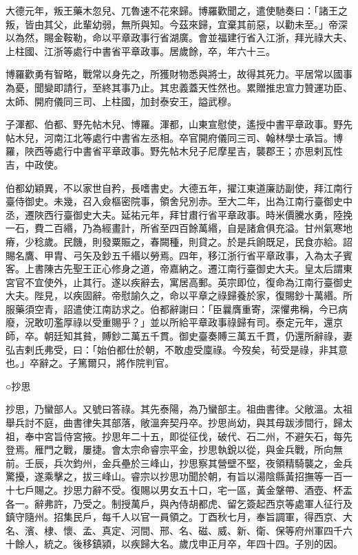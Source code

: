 \begin{pinyinscope}
 大德元年，叛王藥木忽兒、兀魯速不花來歸。博羅歡聞之，遣使馳奏曰：「諸王之叛，皆由其父，此輩幼弱，無所與知。今茲來歸，宜棄其前惡，以勸未至。」帝深以為然，賜金鞍勒，命以平章政事行省湖廣。會並福建行省入江浙，拜光祿大夫、上柱國、江浙等處行中書省平章政事。居歲餘，卒，年六十三。



 博羅歡勇有智略，戰常以身先之，所獲財物悉與將士，故得其死力。平居常以國事為憂，聞變即請行，至終其事乃止。其忠義蓋天性然也。累贈推忠宣力贊運功臣、太師、開府儀同三司、上柱國，加封泰安王，謚武穆。



 子渾都、伯都、野先帖木兒、博羅。渾都，山東宣慰使，遙授中書平章政事。野先帖木兒，河南江北等處行中書省左丞相。卒官開府儀同三司、翰林學士承旨。博羅，陜西等處行中書省平章政事。野先帖木兒子尼摩星吉，襲郡王；亦思剌瓦性吉，中政使。



 伯都幼穎異，不以家世自矜，長嗜書史。大德五年，擢江東道廉訪副使，拜江南行臺侍御史。未幾，召入僉樞密院事，領舍兒別赤。至大二年，出為江南行臺御史中丞，遷陜西行臺御史大夫。延祐元年，拜甘肅行省平章政事。時米價騰水勇，陸挽一石，費二百緡，乃為經畫計，所省至四百餘萬緡，自是諸倉俱充溢。甘州氣寒地瘠，少稔歲。民饑，則發粟賑之，春闕種，則貸之。於是兵餉既足，民食亦給。詔賜名鷹、甲胄、弓矢及鈔五千緡以勞焉。四年，移江浙行省平章政事，入為太子賓客。上書陳古先聖王正心修身之道，帝嘉納之。遷江南行臺御史大夫。皇太后謂東宮官不宜使外，止其行。遂以疾辭去，寓居高郵。英宗即位，復命為江南行臺御史大夫。陛見，以疾固辭。帝慰諭久之，命以平章之祿歸養於家，復賜鈔十萬緡。所服藥須空青，詔遣使江南訪求之。伯都辭謝曰：「臣曩膺重寄，深懼弗稱，今已病廢，況敢叨濫厚祿以受重賜乎？」並以所給平章政事祿歸有司。泰定元年，還京師，卒。朝廷知其貧，賻鈔二萬五千貫。御史臺奏賻三萬五千貫，仍還所辭祿，妻弘吉剌氏弗受，曰：「始伯都仕於朝，不敢虛受廩祿。今歿矣，茍受是祿，非其意也。」卒辭之。子篤爾只，將作院判官。



 ○抄思



 抄思，乃蠻部人。又號曰答祿。其先泰陽，為乃蠻部主。祖曲書律。父敞溫。太祖舉兵討不庭，曲書律失其部落，敞溫奔契丹卒。抄思尚幼，與其母跋涉間行，歸太祖，奉中宮旨侍宮掖。抄思年二十五，即從征伐，破代、石二州，不避矢石，每先登焉。雁門之戰，屢捷。會太宗命睿宗平金，抄思執銳以從，與金兵戰，所向無前。壬辰，兵次鈞州，金兵壘於三峰山，抄思察其營壁不堅，夜領精騎襲之，金兵驚擾，遂乘擊之，拔三峰山。睿宗以抄思功聞於朝，有旨以湯陰縣黃招撫等一百一十七戶賜之。抄思力辭不受。復賜以男女五十口，宅一區，黃金鞶帶、酒壺、杯盂各一。辭弗許，乃受之。制授萬戶，與內侍胡都虎、留乞簽起西京等處軍人征行及鎮守隨州。招集民戶，每千人以官一員領之。丁酉秋七月，奉旨調軍，得西京、大名、濱、棣、懷、孟、真定、河間、邢、名、磁、威、新、衛、保等府州軍四千六十餘人，統之。後移鎮潁，以疾歸大名。歲戊申正月卒，年四十四。子別的因。




\end{pinyinscope}
